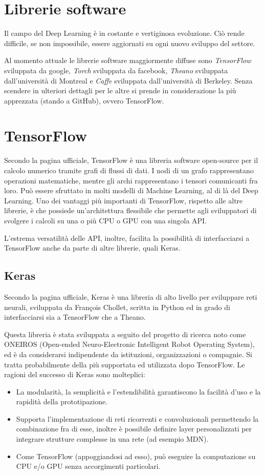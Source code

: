 \section{Librerie software}
Il campo del Deep Learning è in costante e vertiginosa evoluzione. Ciò rende difficile, se non impossibile, essere aggiornati su ogni nuovo sviluppo del settore.

Al momento attuale le librerie software maggiormente diffuse sono \textit{TensorFlow} sviluppata da google, \textit{Torch} sviluppata da facebook, \textit{Theano} sviluppata dall'università di Montreal e \textit{Caffe} sviluppata dall'università di Berkeley. Senza scendere in ulteriori dettagli per le altre si prende in considerazione la più apprezzata (stando a GitHub), ovvero TensorFlow.
\section{TensorFlow} %
\label{sec:tensorflow}
Secondo la pagina ufficiale\cite{tensorflow}, TensorFlow è una libreria software open-source per il calcolo numerico tramite grafi di flussi di dati. I nodi di un grafo rappresentano operazioni matematiche, mentre gli archi rappresentano i tensori comunicanti fra loro. Può essere sfruttato in molti modelli di Machine Learning, al di là del Deep Learning. Uno dei vantaggi più importanti di TensorFlow, rispetto alle altre librerie, è che possiede un'architettura flessibile che permette agli sviluppatori di svolgere i calcoli su una o più CPU o GPU con una singola API.

L'estrema versatilità delle API, inoltre, facilita la possibilità di interfacciarsi a TensorFlow anche da parte di altre librerie, quali Keras.
\subsection{Keras}
Secondo la pagina ufficiale\cite{keras}, Keras è una libreria di alto livello per sviluppare reti neurali, sviluppata da Fran\c{c}ois Chollet, scritta in Python ed in grado di interfacciarsi sia a TensorFlow che a Theano.

Questa libreria è stata sviluppata a seguito del progetto di ricerca noto come ONEIROS (Open-ended Neuro-Electronic Intelligent Robot Operating System), ed è da considerarsi indipendente da istituzioni, organizzazioni o compagnie. Si tratta probabilmente della più supportata ed utilizzata dopo TensorFlow. Le ragioni del successo di Keras sono molteplici: 
\begin{itemize}
	\item La modularità, la semplicità e l'estendibilità garantiscono la facilità d'uso e la rapidità della prototipazione.
	\item Supporta l'implementazione di reti ricorrenti e convoluzionali permettendo la combinazione fra di esse, inoltre è possibile definire layer personalizzati per integrare strutture complesse in una rete (ad esempio MDN).
	\item Come TensorFlow (appoggiandosi ad esso), può eseguire la computazione su CPU e/o GPU senza accorgimenti particolari.
\end{itemize}

